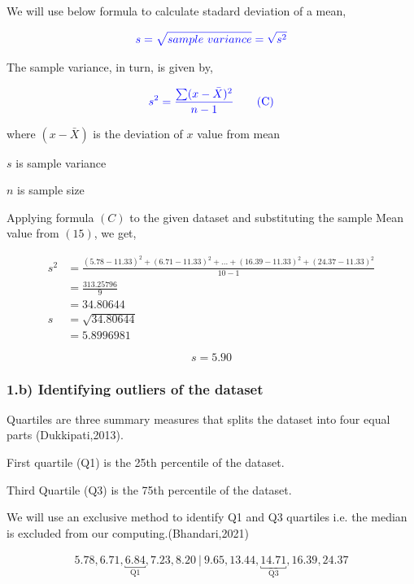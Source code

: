\documentclass[a4paper]{report}
\begin{document}
We will use below formula to calculate stadard deviation of a mean,

\begin{equation*}
    \color{blue} s=\sqrt{sample\ variance} = \sqrt{s^2} 
\end{equation*}

The sample variance, in turn, is given by,

\begin{equation*}
   \color{blue} s ^2=\frac{\sum (x-\bar{X})^2}{n-1} \tag{C}
\end{equation*}

where $(x-\bar{X})$ is the deviation of $x$ value from mean

$s$ is sample variance

$n$ is sample size

Applying formula $(C)$ to the given dataset and substituting the sample Mean value from $(15)$, we get,


\begin{align*}
    s ^2&=\frac{(5.78 - 11.33)^2 + (6.71 - 11.33)^2 + ... + (16.39 - 11.33)^2 + (24.37 - 11.33)^2}{10-1} \\
    &=\frac{313.25796}{9} \\
    &=34.80644\\
    s &= \sqrt{34.80644} \\
    &=5.8996981
\end{align*}

\begin{equation*}
    \boxed{s=5.90}
\end{equation*}

\subsubsection*{1.b) Identifying outliers of the dataset}

Quartiles are three summary measures that splits the dataset into four equal parts (Dukkipati,2013).

First quartile (Q1) is the 25th percentile of the dataset.

Third Quartile (Q3) is the 75th percentile of the dataset.

We will use an exclusive method to identify Q1 and Q3 quartiles i.e. the median is excluded from our computing.(Bhandari,2021)

\begin{align*}
    5.78, 6.71, \underbracket{6.84}_{\text{Q1}}, 7.23, 8.20\ \vert \  9.65, 13.44, \underbracket{14.71}_{\text{Q3}}, 16.39, 24.37
\end{align*}
\end{document}
